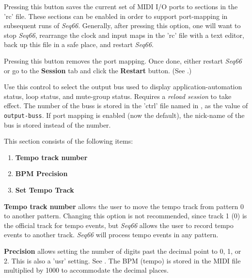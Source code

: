    Pressing this button saves the current set of MIDI I/O ports to sections in
   the 'rc' file.  These sections can be enabled in order to support
   port-mapping in subsequent runs of \textsl{Seq66}.
   Generally, after pressing this option, one will want to stop
   \textsl{Seq66}, rearrange the clock and input maps in the
   'rc' file with a text editor, back up this file in a safe place,
   and restart \textsl{Seq66}.

   Pressing this button removes the port mapping.
   Once done, either restart \textsl{Seq66} or go to the \textbf{Session}
   tab and click the \textbf{Restart} button.
   (See .)

   Use this control to select the output bus used to display
   application-automation status, loop status, and mute-group status.
   Requires a \textsl{reload session} to take effect.
   The number of the buss is stored in the 'ctrl' file named in
   ,
   as the value of \texttt{output-buss}.
   If port mapping is enabled (now the default),
   the nick-name of the bus is stored instead of the number.

   This section consists of the following items:

   \begin{enumerate}
      \item \textbf{Tempo track number}
      \item \textbf{BPM Precision}
      \item \textbf{Set Tempo Track}
   \end{enumerate}

   \textbf{Tempo track number}
   allows the user to move the tempo track from pattern 0 to
   another pattern.  Changing this option is not recommended, since track 1 (0)
   is the official track for tempo events, but \textsl{Seq66} allows the
   user to record tempo events to another track.  \textsl{Seq66} will
   process tempo events in any pattern.

   \textbf{Precision}
   allows setting the number of digits past the decimal point to 0, 1, or 2.
   This is also a 'usr' setting.
   See .
   The BPM (tempo) is stored in the MIDI file multiplied by 1000 to accommodate
   the decimal places.

